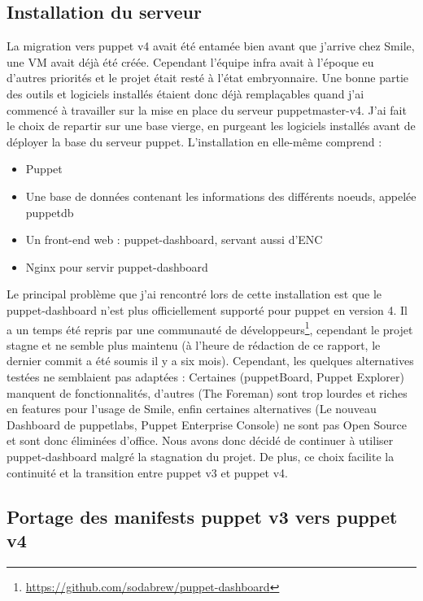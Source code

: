 \documentclass[14 pt,a4paper]{extreport}
\begin{document}
\subsection{Installation du serveur}

La migration vers puppet v4 avait été entamée bien avant que j'arrive chez Smile, une VM avait déjà été créée. Cependant l'équipe infra avait à l'époque eu d'autres priorités et le projet était resté à l'état embryonnaire. Une bonne partie des outils et logiciels installés étaient donc déjà remplaçables quand j'ai commencé à travailler sur la mise en place du serveur puppetmaster-v4. J'ai fait le choix de repartir sur une base vierge, en purgeant les logiciels installés avant de déployer la base du serveur puppet. L'installation en elle-même comprend :

\begin{itemize}
	\item Puppet
	\item Une base de données contenant les informations des différents noeuds, appelée puppetdb
	\item Un front-end web : puppet-dashboard, servant aussi d'ENC
	\item Nginx pour servir puppet-dashboard
\end{itemize}

Le principal problème que j'ai rencontré lors de cette installation est que le puppet-dashboard n'est plus officiellement supporté pour puppet en version 4. Il a un temps été repris par une communauté de développeurs\footnote{\url{https://github.com/sodabrew/puppet-dashboard}}, cependant le projet stagne et ne semble plus maintenu (à l'heure de rédaction de ce rapport, le dernier commit a été soumis il y a six mois). Cependant, les quelques alternatives testées ne semblaient pas adaptées : Certaines (puppetBoard, Puppet Explorer) manquent de fonctionnalités, d'autres (The Foreman) sont trop lourdes et riches en features pour l'usage de Smile, enfin certaines alternatives (Le nouveau Dashboard de puppetlabs, Puppet Enterprise Console) ne sont pas Open Source et sont donc éliminées d'office. Nous avons donc décidé de continuer à utiliser puppet-dashboard malgré la stagnation du projet. De plus, ce choix facilite la continuité et la transition entre puppet v3 et puppet v4.

\subsection{Portage des manifests puppet v3 vers puppet v4}
\end{document}
